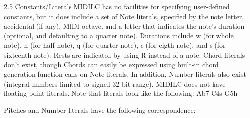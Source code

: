 \documentclass[12pt,A4]{book}
\begin{document}
2.5 Constants/Literals
MIDILC has no facilities for specifying user-defined constants, but it does include a set of Note literals, specified by the note letter, accidental (if any), MIDI octave, and a letter that indicates the note’s duration (optional, and defaulting to a quarter note).  Durations include w (for whole note), h (for half note), q (for quarter note), e (for eigth note), and s (for sixteenth note).  Rests are indicated by using R instead of a note. Chord literals don’t exist, though Chords can easily be expressed using built-in chord generation function calls on Note literals.  In addition, Number literals also exist (integral numbers limited to signed 32-bit range).  MIDILC does not have floating-point literals.
Note that literals look like the following:
Ab7
C4s
G5h

Pitches and Number literals have the following correspondence:
\end{document}
